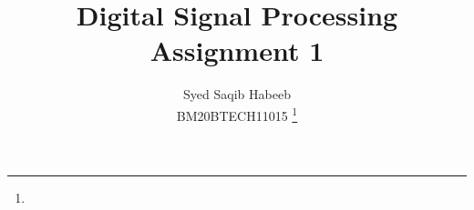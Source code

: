 \documentclass[journal,12pt,twocolumn]{IEEEtran}
\begin{document}

\def\putbox#1#2#3{\makebox[0in][l]{\makebox[#1][l]{}\raisebox{\baselineskip}[0in][0in]{\raisebox{#2}[0in][0in]{#3}}}}
     \def\rightbox#1{\makebox[0in][r]{#1}}
     \def\centbox#1{\makebox[0in]{#1}}
     \def\topbox#1{\raisebox{-\baselineskip}[0in][0in]{#1}}
     \def\midbox#1{\raisebox{-0.5\baselineskip}[0in][0in]{#1}}

\vspace{3cm}

\title{ 
Digital Signal Processing\\Assignment 1
}


%
%
%

\author{ Syed Saqib Habeeb\\BM20BTECH11015 %
\thanks{}%
}
% 
%
\end{document}

